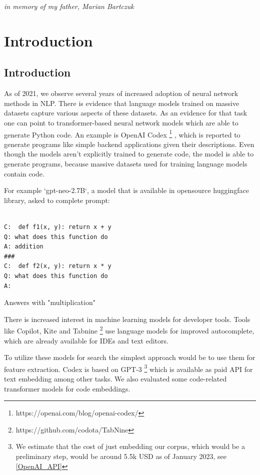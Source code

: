 \documentclass[longabstract,mgr,english]{iithesis}
\author{Jakub Bartczuk}
\begin{document}
\maketitle

\pagebreak
{
  \vspace*{\fill}
  \mbox{}\hfill
  \LARGE{\textit{in memory of my father, Marian Bartczuk}}
}
\pagebreak

\tableofcontents

\chapter{Introduction}


\section{Introduction}

As of 2021, we observe several years of increased adoption of neural network methods in NLP. There is evidence that language models trained on massive datasets
capture various aspects of these datasets. As an evidence for that task one can
point to transformer-based neural network models which are able to generate
Python code. An example is OpenAI Codex
\footnote{https://openai.com/blog/openai-codex/} \cite{codex}, which is reported to generate programs like simple backend applications given their descriptions.
Even though the models aren't explicitly trained to generate code, the model is able to generate programs, because massive datasets used for training language models contain code.

For example `gpt-neo-2.7B`, a model that is available in opensource huggingface library, asked to complete prompt:

\begin{verbatim}

C:  def f1(x, y): return x + y
Q: what does this function do
A: addition
###
C:  def f2(x, y): return x * y
Q: what does this function do
A: 

\end{verbatim}

Answers with "multiplication"

There is increased interest in machine learning models for developer tools. Tools like Copilot, Kite and Tabnine \footnote{https://github.com/codota/TabNine} use language models for improved autocomplete, which are already available for IDEs and text editors.

To utilize these models for search the simplest approach would be to use them for feature extraction. Codex is based on GPT-3 \footnote{We estimate that the cost of just embedding our corpus, which would be a preliminary step, would be around 5.5k USD as of January 2023, see \ref{OpenAI_API}} which is available as paid API for text embedding among other tasks. We also evaluated some code-related transformer models for code embeddings.
\end{document}

